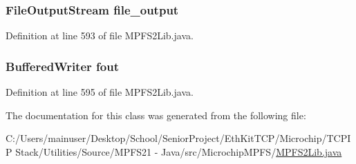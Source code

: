 \hypertarget{class_microchip_m_p_f_s_1_1_m_p_f_s2_lib_1_1_m_p_f_s2_c18_writer_ab03cefa914341b065e79a003ebc36ba5}{}
\subsubsection[{file\+\_\+output}]{\setlength{\rightskip}{0pt plus 5cm}File\+Output\+Stream file\+\_\+output}\label{class_microchip_m_p_f_s_1_1_m_p_f_s2_lib_1_1_m_p_f_s2_c18_writer_ab03cefa914341b065e79a003ebc36ba5}


Definition at line 593 of file M\+P\+F\+S2\+Lib.\+java.

\hypertarget{class_microchip_m_p_f_s_1_1_m_p_f_s2_lib_1_1_m_p_f_s2_c18_writer_aac232ca8514f156a01d70fd44afdd7c1}{}
\subsubsection[{fout}]{\setlength{\rightskip}{0pt plus 5cm}Buffered\+Writer fout}\label{class_microchip_m_p_f_s_1_1_m_p_f_s2_lib_1_1_m_p_f_s2_c18_writer_aac232ca8514f156a01d70fd44afdd7c1}


Definition at line 595 of file M\+P\+F\+S2\+Lib.\+java.



The documentation for this class was generated from the following file\+:\begin{DoxyCompactItemize}
\item 
C\+:/\+Users/mainuser/\+Desktop/\+School/\+Senior\+Project/\+Eth\+Kit\+T\+C\+P/\+Microchip/\+T\+C\+P\+I\+P Stack/\+Utilities/\+Source/\+M\+P\+F\+S21 -\/ Java/src/\+Microchip\+M\+P\+F\+S/\hyperlink{_m_p_f_s2_lib_8java}{M\+P\+F\+S2\+Lib.\+java}\end{DoxyCompactItemize}
